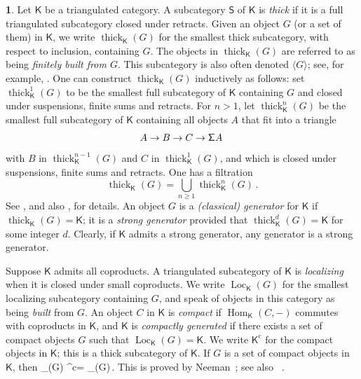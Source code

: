 \documentclass{amsart}
\let\oldequation\equation
\let\oldendequation\endequation
\renewenvironment{equation}{\linenomathNonumbers\oldequation}{\oldendequation\endlinenomath}
\newcommand{\cat}[1]{{\mathsf{#1}}}
\newcommand{\Hom}{\operatorname{Hom}}
\newcommand{\Loc}{\operatorname{Loc}}
\newcommand{\shift}{{\sf\Sigma}}
\newcommand{\thick}{\operatorname{thick}}
\theoremstyle{definition}
\newtheorem{chunk}[subsection]{}
\theoremstyle{remark}
\numberwithin{equation}{subsection}
\begin{document}
\begin{chunk}
\label{ch:thick}
Let $\cat K$ be a triangulated category. A subcategory $\cat{S}$ of $\cat K$ is \emph{thick} if it is a full triangulated subcategory closed under retracts. Given an object $G$ (or a set of them) in $\cat K$, we write $\thick_{\cat K}(G)$ for the smallest thick subcategory, with respect to inclusion, containing $G$. The objects in $\thick_{\cat K}(G)$ are referred to as being \emph{finitely built from $G$}. This subcategory is also often denoted $\langle G \rangle$; see, for example, \cite{Bondal/VanDenBergh:2003}. One can construct $\thick_{\cat K}(G)$ inductively as follows: set $\thick_{\cat K}^1(G)$ to be the smallest full subcategory of $\cat K$ containing $G$ and closed under suspensions, finite sums and retracts. For $n> 1$, let $\thick_{\cat K}^n(G)$ be the smallest full subcategory of $\cat K$ containing all objects $A$ that fit into a triangle 
\[
A\to B\to C\to \shift A\,
\] 
with $B$ in $\thick_{\cat K}^{n-1}(G)$ and $C$ in $\thick_{\cat K}^1 (G)$, and which is closed under suspensions, finite sums and retracts. One has a filtration
\[
\thick_{\cat K}(G) =\bigcup_{n\geqslant 1}\thick_{\cat K}^n(G)\,.
\]
See \cite{Bondal/VanDenBergh:2003}, and also \cite{Avramov/Buchweitz/Iyengar/Miller:2010}, for details. An object $G$ is a \emph{(classical) generator} for $\cat K$ if $\thick_{\cat K}(G)=\cat K$; it is a \emph{strong generator} provided that $\thick_{\cat K}^d(G)=\cat K$ for some integer $d$. Clearly, if $\cat K$ admits a strong generator, any generator is a strong generator. 

Suppose $\cat K$ admits all coproducts. A triangulated subcategory of $\cat K$ is \emph{localizing} when it is closed under small coproducts. We write $\Loc_{\cat K}(G)$ for the smallest localizing subcategory containing $G$, and speak of objects in this category as being \emph{built} from $G$. An object $C$ in $\cat K$ is \emph{compact} if $\Hom_{\cat K}(C,-)$ commutes with coproducts in $\cat K$, and $\cat K$ is \emph{compactly generated} if there exists a set of compact objects $G$ such that $\Loc_{\cat K}(G)=\cat K$. We write ${\cat K}^{\mathrm c}$ for the compact objects in $\cat K$; this is a thick subcategory of $\cat K$. If $G$ is a set of compact objects in $\cat K$, then
\begin{equation}
\label{eq:neeman-cgt}
\Loc_{\cat K}(G) \cap {\cat K}^{\mathrm c}= \thick_{\cat K}(G)\,.
\end{equation}
This is proved by Neeman~\cite[Theorem~2.1]{Neeman:1992a}; see also ~\cite[Proposition~3.4.15]{Krause:2022}.
\end{chunk}
\end{document}
